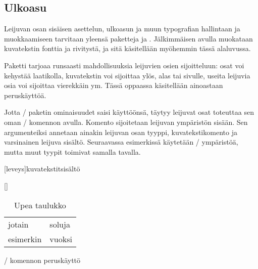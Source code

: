 \begin{koodilohkosis}
\usepackage[section]{placeins}
\end{koodilohkosis}

\subsection{Ulkoasu}
\label{luku/leijuosat-ulkoasu}

Leijuvan osan sisäisen asettelun, ulkoasun ja muun typografian
hallintaan ja muokkaamiseen tarvitaan yleensä paketteja
 ja . Jälkimmäisen avulla
muokataan kuvatekstin fonttia ja rivitystä, ja sitä käsitellään
myöhemmin tässä alaluvussa.

Paketti  tarjoaa runsaasti mahdollisuuksia leijuvien
osien sijoitteluun: osat voi kehystää laatikolla, kuvatekstin voi
sijoittaa ylös, alas tai sivulle, useita leijuvia osia voi sijoittaa
vierekkäin ym. Tässä oppaassa käsitellään ainoastaan peruskäyttöä.

Jotta \-/ paketin ominaisuudet saisi käyttöönsä,
täytyy leijuvat osat toteuttaa sen oman \-/ komennon
avulla. Komento sijoitetaan leijuvan ympäristön sisään. Sen
argumenteiksi annetaan ainakin leijuvan osan tyyppi, kuvatekstikomento
ja varsinainen leijuva sisältö. Seuraavassa esimerkissä käytetään
\-/ ympäristöä, mutta muut tyypit toimivat samalla
tavalla.

\begin{koodilohkosis}
\begin{table}
  [leveys]{kuvatekstit}{sisältö}
\end{table}
\end{koodilohkosis}

\begin{esimerkki*}

\begin{koodilohko}
\begin{table}
  [\FBwidth]{
    \caption{Upea taulukko}    %
    \label{tlk/upea-taulukko}  %
  }{
    \begin{tabular}{ll}
      jotain & soluja \\
      esimerkin & vuoksi \\
    \end{tabular}
  }
\end{table}
\end{koodilohko}
  \caption{\-/ komennon peruskäyttö}
  \label{esim/floatbox-perus}
\end{esimerkki*}

